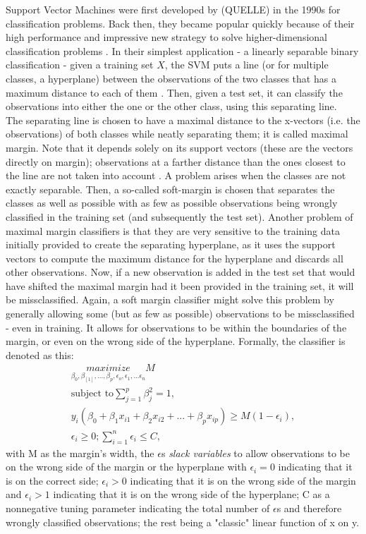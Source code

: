 \documentclass[a4paper, 11pt]{article}
\begin{document}
Support Vector Machines were first developed by (QUELLE) in the 1990s  for classification problems. Back then, they became popular quickly because of their high performance and impressive new strategy to solve higher-dimensional classification problems \citep{James.2013}. In their simplest application - a linearly separable binary classification - given a training set $X$, the SVM puts a line (or for multiple classes, a hyperplane) between the observations of the two classes that has a maximum distance to each of them \cite{Maldonado.2009}. Then, given a test set, it can classify the observations into either the one or the other class, using this separating line. \\
The separating line is chosen to have a maximal distance to the x-vectors (i.e. the observations) of both classes while neatly separating them; it is called maximal margin. Note that it depends solely on its support vectors (these are the vectors directly on margin); observations at a farther distance than the ones closest to the line are not taken into account \citep{James.2013}. A problem arises when the classes are not exactly separable. Then, a so-called soft-margin is chosen that separates the classes as well as possible with as few as possible observations being wrongly classified in the training set (and subsequently the test set).  Another problem of maximal margin classifiers is that they are very sensitive to the training data initially provided to create the separating hyperplane, as it uses the support vectors to compute the maximum distance for the hyperplane and discards all other observations. Now, if a new observation is added in the test set that would have shifted the maximal margin had it been provided in the training set, it will be missclassified. Again, a soft margin classifier might solve this problem by generally allowing some (but as few as possible) observations to be missclassified - even in training. It allows for observations to be within the boundaries of the margin, or even on the wrong side of the hyperplane.
Formally, the classifier is denoted as this:\\
\begin{align}
	\underset{\beta_{0}, \beta_[1], ..., \beta_{p}, \epsilon_{o}, \epsilon_{1}, ... \epsilon_{n}}{maximize} M\\
	\text{subject to} \sum_{j=1}^{p}\beta^{2}_{j} = 1,\\
	y_{i}(\beta_{0} + \beta_{1}x_{i1} + \beta_{2}x_{i2} +...+\beta_{p}x_{ip}) \geq M(1 - \epsilon_{i}),\\
	\epsilon_{i} \geq 0; \sum_{i=1}^{n} \epsilon_{i} \leq C,
\end{align}
with M as the margin's width, the $\epsilon$s \textit{slack variables} to allow observations to be on the wrong side of the margin or the hyperplane \citep{James.2013} with $\epsilon_{i} = 0$ indicating that it is on the correct side; $\epsilon_{i} > 0$ indicating that it is on the wrong side of the margin and  $\epsilon_{i} > 1$ indicating that it is on the wrong side of the hyperplane; C as a nonnegative tuning parameter indicating the total number of $\epsilon$s and therefore wrongly classified observations; the rest being a "classic" linear function of x on y.\\
\end{document}
